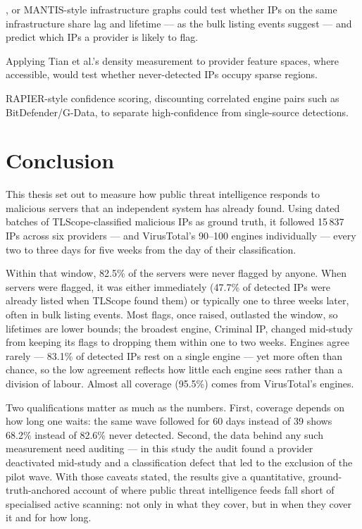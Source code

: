 \begin{description}
    \cite{ramesh2024calcuLatency}, or MANTIS-style infrastructure graphs \cite{deniz2025mantis} could
    test whether IPs on the same infrastructure share lag and lifetime --- as the bulk listing events
    suggest --- and predict which IPs a provider is likely to flag.
  \item[Density-aware validation] Applying Tian et al.'s density measurement
    \cite{tian2025density} to provider feature spaces, where accessible, would test whether
    never-detected IPs occupy sparse regions.
  \item[Indicator quality scoring] RAPIER-style \cite{qing2024rapier} confidence scoring, discounting
    correlated engine pairs such as BitDefender/G-Data, to separate high-confidence from
    single-source detections.
\end{description}

\chapter{Conclusion}
\label{ch:conclusion}

This thesis set out to measure how public threat intelligence responds to malicious servers that an
independent system has already found. Using dated batches of TLScope-classified malicious IPs as
ground truth, it followed 15\,837 IPs across six providers --- and VirusTotal's 90--100 engines
individually --- every two to three days for five weeks from the day of their classification.

Within that window, 82.5\% of the servers were never flagged by anyone. When servers were flagged,
it was either immediately (47.7\% of detected IPs were already listed when TLScope found them) or
typically one to three weeks later, often in bulk listing events. Most flags, once raised, outlasted
the window, so lifetimes are lower bounds; the broadest engine, Criminal IP, changed mid-study from
keeping its flags to dropping them within one to two weeks. Engines agree rarely --- 83.1\% of
detected IPs rest on a single engine --- yet more often than chance, so the low agreement reflects
how little each engine sees rather than a division of labour. Almost all coverage (95.5\%) comes
from VirusTotal's engines.

Two qualifications matter as much as the numbers. First, coverage depends on how long one waits:
the same wave followed for 60 days instead of 39 shows 68.2\% instead of 82.6\% never detected.
Second, the data behind any such measurement need auditing --- in this study the audit found a
provider deactivated mid-study and a classification defect that led to the exclusion of the pilot
wave. With those caveats stated, the results give a quantitative, ground-truth-anchored account of
where public threat intelligence feeds fall short of specialised active scanning: not only in what
they cover, but in when they cover it and for how long.

